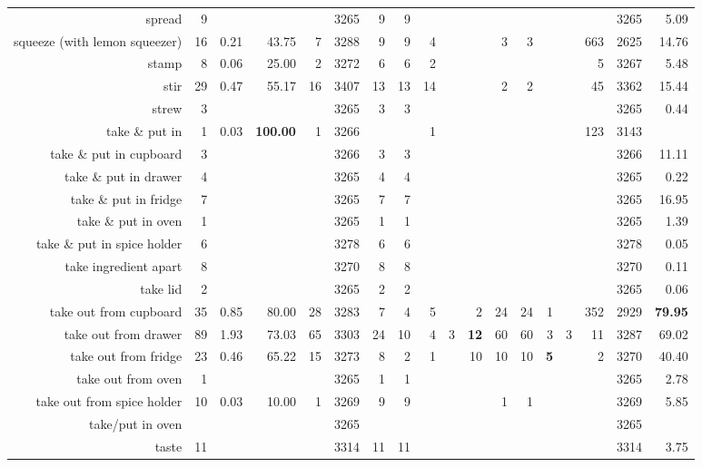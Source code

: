 \begin{tabular}{r r r@{\ \ }r@{\ \ }r@{\ \ }r@{\ \ }r r@{\ \ }r@{\ \ }r@{\ \ }r@{\ \ }r@{\ \ }r@{\ \ }r@{\ \ }r@{\ \ }r@{\ \ }r r}
spread & 9 &  &  &  & 3265 & 9 & 9 &  &  &  &  &  &  &  &  & 3265 & 5.09 \\
squeeze (with lemon squeezer) & 16 & 0.21 & 43.75 & 7 & 3288 & 9 & 9 & 4 &  &  & 3 & 3 &  &  & 663 & 2625 & 14.76 \\
stamp & 8 & 0.06 & 25.00 & 2 & 3272 & 6 & 6 & 2 &  &  &  &  &  &  & 5 & 3267 & 5.48 \\
stir & 29 & 0.47 & 55.17 & 16 & 3407 & 13 & 13 & 14 &  &  & 2 & 2 &  &  & 45 & 3362 & 15.44 \\
strew & 3 &  &  &  & 3265 & 3 & 3 &  &  &  &  &  &  &  &  & 3265 & 0.44 \\
take \& put in  & 1 & 0.03 & \textbf{100.00} & 1 & 3266 &  &  & 1 &  &  &  &  &  &  & 123 & 3143 &  \\
take \& put in cupboard & 3 &  &  &  & 3266 & 3 & 3 &  &  &  &  &  &  &  &  & 3266 & 11.11 \\
take \& put in drawer & 4 &  &  &  & 3265 & 4 & 4 &  &  &  &  &  &  &  &  & 3265 & 0.22 \\
take \& put in fridge & 7 &  &  &  & 3265 & 7 & 7 &  &  &  &  &  &  &  &  & 3265 & 16.95 \\
take \& put in oven & 1 &  &  &  & 3265 & 1 & 1 &  &  &  &  &  &  &  &  & 3265 & 1.39 \\
take \& put in spice holder & 6 &  &  &  & 3278 & 6 & 6 &  &  &  &  &  &  &  &  & 3278 & 0.05 \\
take ingredient apart & 8 &  &  &  & 3270 & 8 & 8 &  &  &  &  &  &  &  &  & 3270 & 0.11 \\
take lid & 2 &  &  &  & 3265 & 2 & 2 &  &  &  &  &  &  &  &  & 3265 & 0.06 \\
take out from cupboard & 35 & 0.85 & 80.00 & 28 & 3283 & 7 & 4 & 5 &  & 2 & 24 & 24 & 1 &  & 352 & 2929 & \textbf{79.95} \\
take out from drawer & 89 & 1.93 & 73.03 & 65 & 3303 & 24 & 10 & 4 & 3 & \textbf{12} & 60 & 60 & 3 & 3 & 11 & 3287 & 69.02 \\
take out from fridge & 23 & 0.46 & 65.22 & 15 & 3273 & 8 & 2 & 1 &  & 10 & 10 & 10 & \textbf{5} &  & 2 & 3270 & 40.40 \\
take out from oven & 1 &  &  &  & 3265 & 1 & 1 &  &  &  &  &  &  &  &  & 3265 & 2.78 \\
take out from spice holder & 10 & 0.03 & 10.00 & 1 & 3269 & 9 & 9 &  &  &  & 1 & 1 &  &  &  & 3269 & 5.85 \\
take/put in oven &  &  &  &  & 3265 &  &  &  &  &  &  &  &  &  &  & 3265 &  \\
taste & 11 &  &  &  & 3314 & 11 & 11 &  &  &  &  &  &  &  &  & 3314 & 3.75 \\

\end{tabular}
